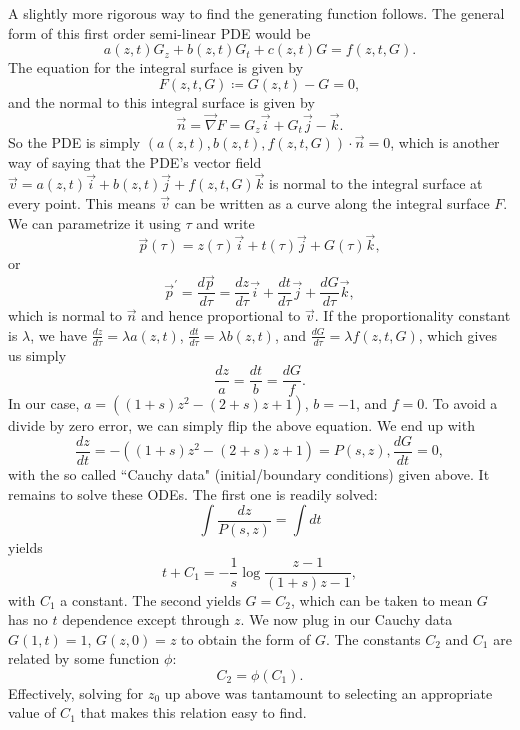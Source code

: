 \documentclass[10pt]{revtex4}
\begin{document}
A slightly more rigorous way to find the generating function follows.
The general form of this first order semi-linear PDE would be
\begin{equation}
a(z,t)G_z + b(z,t)G_t + c(z,t)G = f(z,t,G).
\end{equation}
The equation for the integral surface is given by
\begin{equation}
F(z,t,G) \coloneqq G(z,t) - G = 0,
\end{equation}
and the normal to this integral surface is given by
\begin{equation}
\vec{n} = \vec{\nabla} F = G_z \vec{i} + G_t \vec{j} - \vec{k}.
\end{equation}
So the PDE is simply $(a(z,t),b(z,t),f(z,t,G)) \cdot \vec{n} = 0$, which is another way of saying that the PDE's vector field $\vec{v} = a(z,t)\vec{i} + b(z,t)\vec{j} + f(z,t,G)\vec{k}$ is normal to the integral surface at every point.
This means $\vec{v}$ can be written as a curve along the integral surface $F$.
We can parametrize it using $\tau$ and write
\begin{equation}
\vec{p}(\tau ) = z(\tau) \vec{i} + t(\tau) \vec{j} + G(\tau ) \vec{k},
\end{equation}
or
\begin{equation}
\vec{p}^\prime = \frac{d\vec{p}}{d\tau} = \frac{dz}{d\tau} \vec{i} + \frac{dt}{d\tau} \vec{j} + \frac{dG}{d\tau} \vec{k},
\end{equation}
which is normal to $\vec{n}$ and hence proportional to $\vec{v}$.
If the proportionality constant is $\lambda$, we have $\frac{dz}{d\tau} = \lambda a(z,t)$, $\frac{dt}{d\tau} = \lambda b(z,t)$, and $\frac{dG}{d\tau} = \lambda f(z,t,G)$, which gives us simply
\begin{equation}
\frac{dz}{a} = \frac{dt}{b} = \frac{dG}{f}.
\end{equation}
In our case, $a = ((1+s)z^2 - (2+s)z +1)$, $b = -1$, and $f = 0$.
To avoid a divide by zero error, we can simply flip the above equation.
We end up with
\begin{equation}
\frac{dz}{dt} = -((1+s)z^2 - (2+s)z +1) = P(s,z), \frac{dG}{dt} = 0,
\end{equation}
with the so called ``Cauchy data" (initial/boundary conditions) given above.
It remains to solve these ODEs.
The first one is readily solved:
\begin{equation}
\int \frac{dz}{P(s,z)} = \int dt
\end{equation}
yields
\begin{equation}
t + C_1 = -\frac{1}{s}\log \frac{z-1}{(1+s)z-1},
\end{equation}
with $C_1$ a constant.
The second yields $G = C_2$, which can be taken to mean $G$ has no $t$ dependence except through $z$.
We now plug in our Cauchy data $G(1,t) = 1$, $G(z,0) = z$ to obtain the form of $G$.
The constants $C_2$ and $C_1$ are related by some function $\phi$:
\begin{equation}
C_2 = \phi(C_1).
\end{equation}
Effectively, solving for $z_0$ up above was tantamount to selecting an appropriate value of $C_1$ that makes this relation easy to find.
\end{document}
